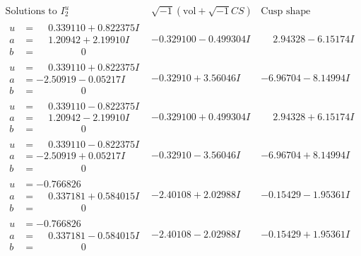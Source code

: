 \documentclass[1p]{elsarticle_modified}
\theoremstyle{definition}
\newcommand{\I}{\sqrt{-1}}
\begin{document}
$$\begin{array}{c|c|c}  
\text{Solutions to }I^u_{2}& \I (\text{vol} + \sqrt{-1}CS) & \text{Cusp shape}\\
 \hline 
\begin{aligned}
u &= \phantom{-}0.339110 + 0.822375 I \\
a &= \phantom{-}1.20942 + 2.19910 I \\
b &= \phantom{-0.000000 } 0\end{aligned}
 & -0.329100 - 0.499304 I & \phantom{-}2.94328 - 6.15174 I \\ \hline\begin{aligned}
u &= \phantom{-}0.339110 + 0.822375 I \\
a &= -2.50919 - 0.05217 I \\
b &= \phantom{-0.000000 } 0\end{aligned}
 & -0.32910 + 3.56046 I & -6.96704 - 8.14994 I \\ \hline\begin{aligned}
u &= \phantom{-}0.339110 - 0.822375 I \\
a &= \phantom{-}1.20942 - 2.19910 I \\
b &= \phantom{-0.000000 } 0\end{aligned}
 & -0.329100 + 0.499304 I & \phantom{-}2.94328 + 6.15174 I \\ \hline\begin{aligned}
u &= \phantom{-}0.339110 - 0.822375 I \\
a &= -2.50919 + 0.05217 I \\
b &= \phantom{-0.000000 } 0\end{aligned}
 & -0.32910 - 3.56046 I & -6.96704 + 8.14994 I \\ \hline\begin{aligned}
u &= -0.766826\phantom{ +0.000000I} \\
a &= \phantom{-}0.337181 + 0.584015 I \\
b &= \phantom{-0.000000 } 0\end{aligned}
 & -2.40108 + 2.02988 I & -0.15429 - 1.95361 I \\ \hline\begin{aligned}
u &= -0.766826\phantom{ +0.000000I} \\
a &= \phantom{-}0.337181 - 0.584015 I \\
b &= \phantom{-0.000000 } 0\end{aligned}
 & -2.40108 - 2.02988 I & -0.15429 + 1.95361 I \\ \hline\begin{aligned}

\end{aligned}
\end{array}$$
\end{document}
